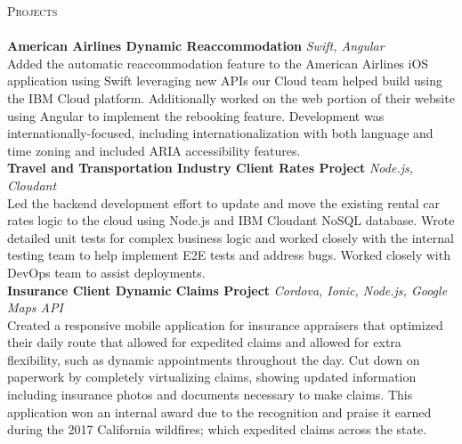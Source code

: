 \documentclass[a4paper]{article}
\newcommand{\lineunder} {
    \vspace*{-8pt} \\
    \hspace*{-18pt} \hrulefill \\
}
\newcommand{\header} [1] {
    {\hspace*{-18pt}\vspace*{6pt} \textsc{#1}}
    \vspace*{-6pt} \lineunder
}
\begin{document}
\header{Projects}
{\textbf{American Airlines Dynamic Reaccommodation}} {\sl Swift, Angular} \\
Added the automatic reaccommodation feature to the American Airlines iOS application using Swift leveraging new APIs our Cloud team helped build using the IBM Cloud platform. Additionally worked on the web portion of their website using Angular to implement the rebooking feature. Development was internationally-focused, including internationalization with both language and time zoning and included ARIA accessibility features.\\
\vspace*{2mm}
{\textbf{Travel and Transportation Industry Client Rates Project}} {\sl Node.js, Cloudant} \\
Led the backend development effort to update and move the existing rental car rates logic to the cloud using Node.js and IBM Cloudant NoSQL database. Wrote detailed unit tests for complex business logic and worked closely with the internal testing team to help implement E2E tests and address bugs. Worked closely with DevOps team to assist deployments.\\
\vspace*{2mm}
\pagebreak
{\textbf{Insurance Client Dynamic Claims Project}} {\sl Cordova, Ionic, Node.js, Google Maps API} \\
Created a responsive mobile application for insurance appraisers that optimized their daily route that allowed for expedited claims and allowed for extra flexibility, such as dynamic appointments throughout the day. Cut down on paperwork by completely virtualizing claims, showing updated information including insurance photos and documents necessary to make claims. This application won an internal award due to the recognition and praise it earned during the 2017 California wildfires; which expedited claims across the state.\\
\vspace*{2mm}
\end{document}
